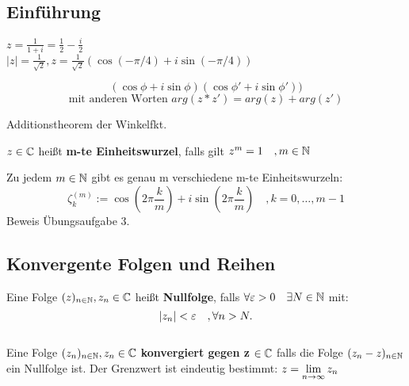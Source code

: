 \subsection{Einführung}

\begin{beispiel}
$z = \frac{1}{1+i} = \frac{1}{2} - \frac{i}{2}$\\
$|z| = \frac{1}{\sqrt{2}}, z = \frac{1}{\sqrt{2}}(\cos(-\pi/4)+i\sin(-\pi/4))$
\end{beispiel}

\begin{lemma}
\[
(\cos\phi + i\sin\phi)(\cos\phi\prime + i\sin\phi\prime))
\]
\[ \text{mit anderen Worten } arg(z*z\prime) = arg(z)+ arg(z\prime)
\]
\end{lemma}

\begin{bew}
Additionstheorem der Winkelfkt.
\end{bew}
\begin{bemerkung}
\end{bemerkung}

\begin{definition}
$z \in \mathbb{C} $ heißt \textbf{m-te Einheitswurzel}, falls gilt $z^m = 1 \quad, m \in \mathbb{N}$
\end{definition}
\begin{satz}
Zu jedem $m \in \mathbb{N}$ gibt es genau m verschiedene m-te Einheitswurzeln:
\[
\zeta^{(m)}_k := \cos(2\pi\frac{k}{m})+i\sin(2\pi\frac{k}{m})\quad, k=0,\dots,m-1
\]
Beweis Übungsaufgabe 3.
\end{satz}

\subsection{Konvergente Folgen und Reihen}
\begin{definition}
Eine Folge $(z)_{n \in \mathbb{N}}, z_n \in \mathbb{C}$ heißt \textbf{Nullfolge}, falls $\forall \varepsilon > 0 \quad \exists N \in \mathbb{N}$ mit: 
\[|z_n| < \varepsilon \quad ,\forall n>N.\] \\
Eine Folge $(z_n)_{n\in \mathbb{N}}, z_n \in \mathbb{C}$ \textbf{konvergiert gegen z} $\in \mathbb{C}$
falls die Folge $(z_n-z)_{n\in \mathbb{N}}$ ein Nullfolge ist. Der Grenzwert ist eindeutig bestimmt: 
$\begin{displaystyle}
	z = \lim_{n \to \infty}z_n
\end{displaystyle}$
\end{definition}

